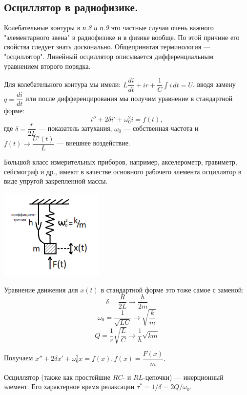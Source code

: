\documentclass[../main/main.tex]{subfiles}
\begin{document}
\subsection{Осциллятор в радиофизике.}

Колебательные контуры в \textit{п.8 и п.9} это частные случаи очень важного "элементарного звена"{} в радиофизике и в физике вообще. По этой причине его свойства следует знать досконально. Общепринятая терминология --- "осциллятор". Линейный осциллятор описывается дифференциальным уравнением второго порядка.

Для колебательного контура мы имели: $L \dfrac{di}{dt} + i r + \dfrac{1}{C} \displaystyle \int i \, dt = U$, вводя замену $q = \dfrac{di}{dt}$ или после дифференцирования мы получим уравнение в стандартной форме:
$$i'' + 2\delta i' + \omega_0^2i = f(t),$$
где $\delta = \dfrac{r}{2L}$ --- показатель затухания, $\omega_0$ --- собственная частота и $f(t) \rightarrow \dfrac{U'(t)}{L}$ --- внешнее воздействие. 

Большой класс измерительных приборов, например, акселерометр, гравиметр, сейсмограф и др., имеют в качестве основного рабочего элемента осциллятор в виде упругой закрепленной массы.

\begin{minipage}{6cm}
\centering
\includegraphics[scale=0.7]{../section01/images/oscillator/oscillator.png} %
\end{minipage} \hfill   
\begin{minipage}{10cm}
Уравнение движения для $x(t)$ в стандартной форме это тоже самое с заменой:
$$\delta = \dfrac{R}{2L} \rightarrow \dfrac{h}{2m}$$
$$\omega_0 = \dfrac{1}{\sqrt{LC}} \rightarrow \sqrt{\dfrac{k}{m}}$$
$$Q = \dfrac{1}{r} \sqrt{\dfrac{L}{C}} \rightarrow \dfrac{1}{h} \sqrt{km}$$
\end{minipage}
Получаем $x'' + 2\delta x' + \omega_0^2x = f(x), f(x) = \dfrac{F(x)}{m}.$

Осциллятор (также как простейшие $RC$- и $RL$-цепочки) --- инерционный элемент. Его характерное время релаксации $\tau^* = 1/\delta = 2Q/\omega_0$.
\end{document}
